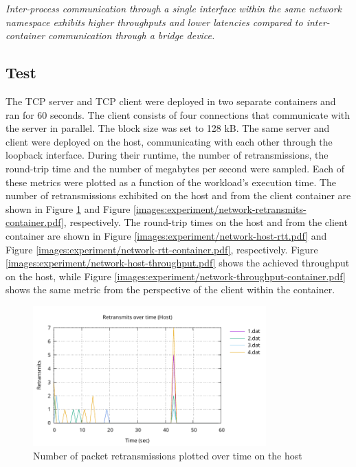 \textit{Inter-process communication through a single interface within the same network namespace 
exhibits higher throughputs and lower latencies compared to inter-container communication through a bridge device.}

\subsection{Test}
The TCP server and TCP client were deployed in two separate containers and ran for 60 seconds. 
The client consists of four connections that communicate with the server in parallel.
The block size was set to 128 kB. The same server and client were deployed on the host, communicating
with each other through the loopback interface. During their runtime, the number of retransmissions, 
the round-trip time and the number of megabytes per second were sampled. Each of these metrics 
were plotted as a function of the workload's execution time.
The number of retransmissions exhibited on the host and from the client container are shown in 
Figure \ref{images:experiment/network-host-retransmits.pdf} and Figure \ref{images:experiment/network-retransmits-container.pdf}, respectively.
The round-trip times on the host and from the client container are shown in Figure \ref{images:experiment/network-host-rtt.pdf}
and Figure \ref{images:experiment/network-rtt-container.pdf}, respectively.
Figure \ref{images:experiment/network-host-throughput.pdf} shows the achieved throughput 
on the host, while Figure \ref{images:experiment/network-throughput-container.pdf} shows the 
same metric from the perspective of the client within the container.

\begin{figure}[H]
    \centering
    \includegraphics[width=0.8\textwidth]{images/results/network-host-retransmits.pdf}
    \caption{Number of packet retransmissions plotted over time on the host}
    \label{images:experiment/network-host-retransmits.pdf}
\end{figure}

